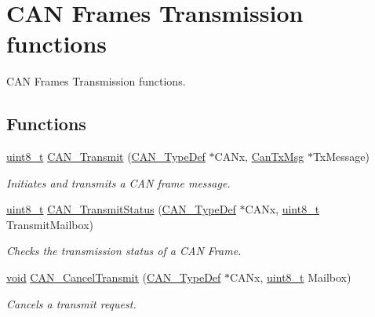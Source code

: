 \hypertarget{group___c_a_n___group2}{\section{C\-A\-N Frames Transmission functions}
\label{group___c_a_n___group2}
}


C\-A\-N Frames Transmission functions.  


\subsection*{Functions}
\begin{DoxyCompactItemize}
\item 
\hyperlink{stdint_8h_aba7bc1797add20fe3efdf37ced1182c5}{uint8\-\_\-t} \hyperlink{group___c_a_n___group2_gaccfcb81f76f58400077c7b2d8641dd83}{C\-A\-N\-\_\-\-Transmit} (\hyperlink{struct_c_a_n___type_def}{C\-A\-N\-\_\-\-Type\-Def} $\ast$C\-A\-Nx, \hyperlink{struct_can_tx_msg}{Can\-Tx\-Msg} $\ast$Tx\-Message)
\begin{DoxyCompactList}\small\item\em Initiates and transmits a C\-A\-N frame message. \end{DoxyCompactList}\item 
\hyperlink{stdint_8h_aba7bc1797add20fe3efdf37ced1182c5}{uint8\-\_\-t} \hyperlink{group___c_a_n___group2_ga68ab05a0a6cdfcc2b6f6b6b2c10848e2}{C\-A\-N\-\_\-\-Transmit\-Status} (\hyperlink{struct_c_a_n___type_def}{C\-A\-N\-\_\-\-Type\-Def} $\ast$C\-A\-Nx, \hyperlink{stdint_8h_aba7bc1797add20fe3efdf37ced1182c5}{uint8\-\_\-t} Transmit\-Mailbox)
\begin{DoxyCompactList}\small\item\em Checks the transmission status of a C\-A\-N Frame. \end{DoxyCompactList}\item 
\hyperlink{group___n_a_m_e_ga18028b8badbf1ea7e704ccac3c488e82}{void} \hyperlink{group___c_a_n___group2_ga81106cdf5395a1947bfc87ec1685829e}{C\-A\-N\-\_\-\-Cancel\-Transmit} (\hyperlink{struct_c_a_n___type_def}{C\-A\-N\-\_\-\-Type\-Def} $\ast$C\-A\-Nx, \hyperlink{stdint_8h_aba7bc1797add20fe3efdf37ced1182c5}{uint8\-\_\-t} Mailbox)
\begin{DoxyCompactList}\small\item\em Cancels a transmit request. \end{DoxyCompactList}\end{DoxyCompactItemize}


